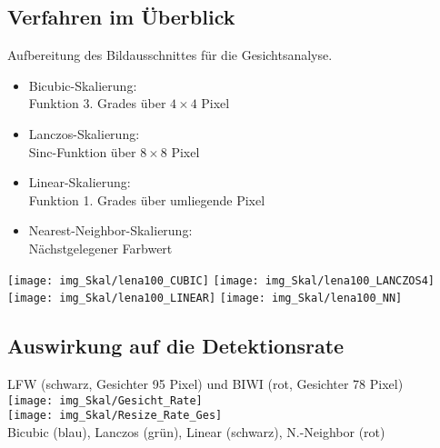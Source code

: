 \subsection{Verfahren im Überblick}
\begin{frame}
Aufbereitung des Bildausschnittes für die Gesichtsanalyse.
\begin{itemize}
	\item<1-> Bicubic-Skalierung:\\
	Funktion 3. Grades über $4\times 4$ Pixel
	\item<1-> Lanczos-Skalierung:\\
	Sinc-Funktion über $8\times 8$ Pixel
	\item<1-> Linear-Skalierung:\\
	Funktion 1. Grades über umliegende Pixel
	\item<1-> Nearest-Neighbor-Skalierung:\\
	Nächstgelegener Farbwert
\end{itemize}
		\begin{center}
			\texttt{[image: img\_Skal/lena100\_CUBIC]}
			\texttt{[image: img\_Skal/lena100\_LANCZOS4]}
			\texttt{[image: img\_Skal/lena100\_LINEAR]}
			\texttt{[image: img\_Skal/lena100\_NN]}
		\end{center}
\end{frame}
\subsection{Auswirkung auf die Detektionsrate}
\begin{frame}
\begin{center}
	\footnotesize{LFW (schwarz, Gesichter 95 Pixel) und BIWI (rot,  Gesichter 78 Pixel)}\\
\texttt{[image: img\_Skal/Gesicht\_Rate]}\\
\texttt{[image: img\_Skal/Resize\_Rate\_Ges]}\\
\footnotesize{Bicubic (blau), Lanczos (grün), Linear (schwarz), N.-Neighbor (rot)}
\end{center}
\end{frame}